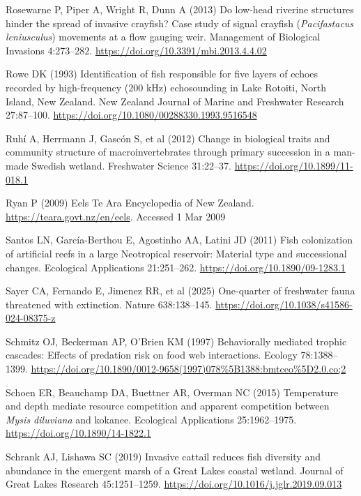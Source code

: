 \documentclass[
  12pt,
  a4paper,
  oneside]{scrbook}
\newlength{\cslhangindent}
\newenvironment{CSLReferences}[2] %
 {\begin{list}{}{%
  \setlength{\itemindent}{0pt}
  \setlength{\leftmargin}{0pt}
  \setlength{\parsep}{0pt}
  \ifodd #1
   \setlength{\leftmargin}{\cslhangindent}
   \setlength{\itemindent}{-1\cslhangindent}
  \fi
  \setlength{\itemsep}{#2\baselineskip}}}
 {\end{list}}
\renewenvironment{CSLReferences}[2]
   {\begin{list}{}{%
    \setlength{\itemindent}{0pt}
    \setlength{\leftmargin}{0pt}
    \setlength{\parsep}{0pt}
    \ifodd #1
     \setlength{\leftmargin}{\cslhangindent}
     \setlength{\itemindent}{-1\cslhangindent}
    \fi
    \setlength{\itemsep}{0.3\baselineskip}}}
   {\end{list}}%
\begin{document}
\begin{CSLReferences}{1}{1}
Rosewarne P, Piper A, Wright R, Dunn A (2013) Do low-head riverine
structures hinder the spread of invasive crayfish? Case study of signal
crayfish ({\emph{Pacifastacus leniusculus}}) movements at a flow gauging
weir. Management of Biological Invasions 4:273--282.
\url{https://doi.org/10.3391/mbi.2013.4.4.02}

Rowe DK (1993) Identification of fish responsible for five layers of
echoes recorded by high-frequency (200 kHz) echosounding in {Lake
Rotoiti}, {North Island, New Zealand}. New Zealand Journal of Marine and
Freshwater Research 27:87--100.
\url{https://doi.org/10.1080/00288330.1993.9516548}

Ruhí A, Herrmann J, Gascón S, et al (2012) Change in biological traits
and community structure of macroinvertebrates through primary succession
in a man-made {Swedish wetland}. Freshwater Science 31:22--37.
\url{https://doi.org/10.1899/11-018.1}

Ryan P (2009) Eels \textbar{} {Te Ara Encyclopedia of New Zealand}.
\url{https://teara.govt.nz/en/eels}. Accessed 1 Mar 2009

Santos LN, García-Berthou E, Agostinho AA, Latini JD (2011) Fish
colonization of artificial reefs in a large {Neotropical} reservoir:
Material type and successional changes. Ecological Applications
21:251--262. \url{https://doi.org/10.1890/09-1283.1}

Sayer CA, Fernando E, Jimenez RR, et al (2025) One-quarter of freshwater
fauna threatened with extinction. Nature 638:138--145.
\url{https://doi.org/10.1038/s41586-024-08375-z}

Schmitz OJ, Beckerman AP, O'Brien KM (1997) Behaviorally mediated
trophic cascades: Effects of predation risk on food web interactions.
Ecology 78:1388--1399.
\url{https://doi.org/10.1890/0012-9658(1997)078\%5B1388:bmtceo\%5D2.0.co;2}

Schoen ER, Beauchamp DA, Buettner AR, Overman NC (2015) Temperature and
depth mediate resource competition and apparent competition between
{\emph{Mysis diluviana}} and kokanee. Ecological Applications
25:1962--1975. \url{https://doi.org/10.1890/14-1822.1}

Schrank AJ, Lishawa SC (2019) Invasive cattail reduces fish diversity
and abundance in the emergent marsh of a {Great Lakes} coastal wetland.
Journal of Great Lakes Research 45:1251--1259.
\url{https://doi.org/10.1016/j.jglr.2019.09.013}


\end{CSLReferences}
\end{document}
